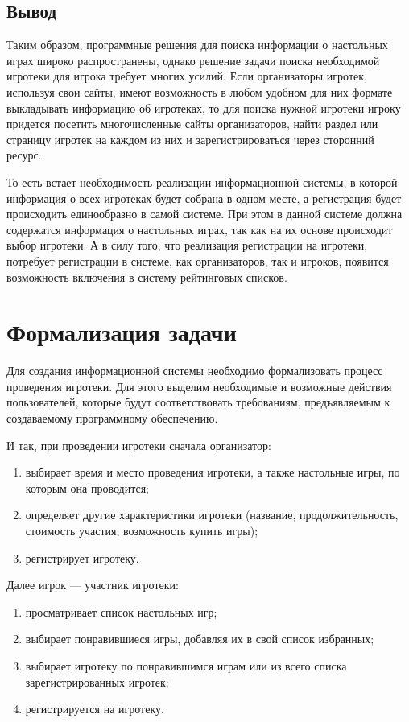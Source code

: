 \subsection*{Вывод}

Таким образом, программные решения для поиска информации о настольных играх
широко распространены, однако решение задачи поиска необходимой игротеки для
игрока требует многих усилий. Если организаторы игротек, используя свои сайты,
имеют возможность в любом удобном для них формате выкладывать информацию об
игротеках, то для поиска нужной игротеки игроку придется посетить многочисленные
сайты организаторов, найти раздел или страницу игротек на каждом из них и
зарегистрироваться через сторонний ресурс.

То есть встает необходимость реализации информационной системы, в которой
информация о всех игротеках будет собрана в одном месте, а регистрация будет
происходить единообразно в самой системе. При этом в данной системе должна
содержатся информация о настольных играх, так как на их основе происходит выбор
игротеки. А в силу того, что реализация регистрации на игротеки, потребует
регистрации в системе, как организаторов, так и игроков, появится возможность
включения в систему рейтинговых списков.

\section{Формализация задачи}

Для создания информационной системы необходимо формализовать процесс проведения
игротеки. Для этого выделим необходимые и возможные действия пользователей,
которые будут соответствовать требованиям, предъявляемым к
создаваемому программному обеспечению.

И так, при проведении игротеки сначала организатор:
\begin{enumerate}[label=\arabic*)]
    \item выбирает время и место проведения игротеки, а также настольные игры,
      по которым она проводится;
    \item определяет другие характеристики игротеки (название,
        продолжительность, стоимость участия, возможность купить игры);
    \item регистрирует игротеку.
\end{enumerate}

Далее игрок --- участник игротеки:
\begin{enumerate}[label=\arabic*)]
    \item просматривает список настольных игр;
    \item выбирает понравившиеся игры, добавляя их в свой список избранных;
    \item выбирает игротеку по понравившимся играм или из всего списка
        зарегистрированных игротек;
    \item регистрируется на игротеку.
\end{enumerate}

